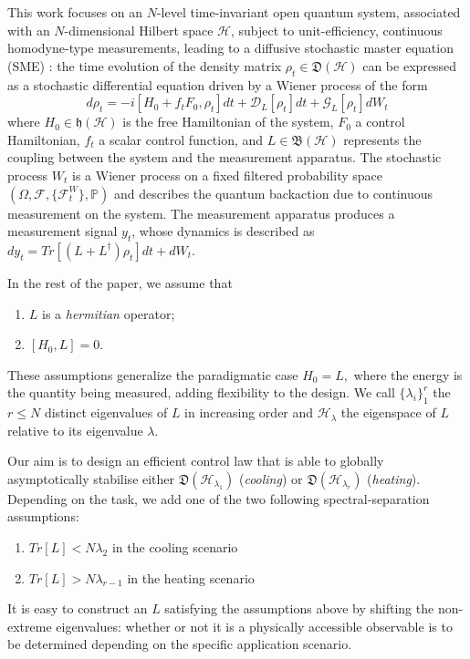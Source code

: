\documentclass[conference]{IEEEtran}
\newcommand{\DHL}[1]{\mathfrak D(\mathcal H_{#1})}
\theoremstyle{plain}
\theoremstyle{plain}
\theoremstyle{plain}
\theoremstyle{plain}
\theoremstyle{remark}
\theoremstyle{definition}
\begin{document}
This work focuses on an $N$-level time-invariant open quantum system, associated with an $N$-dimensional Hilbert space $\mathcal H$, subject to unit-efficiency, continuous homodyne-type measurements, leading to a diffusive stochastic master equation (SME) \cite{AltafiniIntroduction2012,barchielli,wisemanmilburn}: the time evolution of the density matrix $\rho_t \in \mathfrak D(\mathcal H)$ can be expressed as a stochastic differential equation driven by a Wiener process of the form
\begin{equation}
    d\rho_t = -i[H_0 + f_tF_0, \rho_t]dt + \mathcal D_L[\rho_t]dt + \mathcal G_L[\rho_t]dW_t \label{model:ctrl}
\end{equation}
where $H_0 \in \mathfrak{h}(\mathcal H)$ is the free Hamiltonian of the system, $F_0$ a control Hamiltonian, $f_t$ a scalar control function, and $L \in \mathfrak B(\mathcal H)$ represents the coupling between the system and the measurement apparatus. The stochastic process $W_t$ is a Wiener process on a fixed filtered probability space $(\Omega, \mathcal F, \{\mathcal F_t^W\}, \mathbb P)$ and describes the quantum backaction due to continuous measurement on the system.
The measurement apparatus produces a measurement signal $y_t$, whose dynamics is described as \(
    dy_t = Tr[(L + L^\dagger)\rho_t]dt + dW_t.
\)

In the rest of the paper, we assume that \begin{enumerate}
    \item [$(A_1)$] $L$ is a \emph{hermitian} operator;
    \item [$(A_2)$] $[H_0, L] = 0.$
\end{enumerate} 
These assumptions generalize the paradigmatic case $H_0=L,$ where the energy is the quantity being measured, adding flexibility to the design. We call $\{\lambda_i\}_1^r$ the $r \le N$ distinct eigenvalues of $L$ in increasing order and $\mathcal H_\lambda$ the eigenspace of $L$ relative to its eigenvalue $\lambda$.

Our aim is to design an efficient control law that is able to globally asymptotically stabilise either $\DHL{\lambda_1}$ (\emph{cooling}) or $\DHL{\lambda_r}$ (\emph{heating}). Depending on the task, we add one of the two following spectral-separation assumptions: \begin{enumerate}
    \item [$(A_3^c)$] $Tr[L] < N\lambda_2$ in the cooling scenario
    \item [$(A_3^h)$] $Tr[L] > N\lambda_{r - 1}$ in the heating scenario
\end{enumerate}
{It is easy to construct an $L$ satisfying the assumptions above by shifting the non-extreme eigenvalues: whether or not it is a physically accessible observable is to be determined depending on the specific application scenario.}
\end{document}
